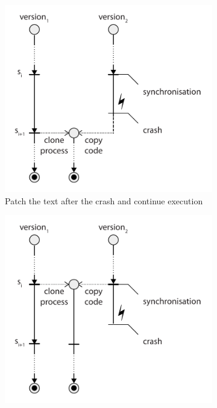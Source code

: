 \begin{figure}[!t]
  \begin{center}
    \begin{subfigure}[b]{0.45\textwidth}
      \includegraphics[width=\textwidth]{multi-version/figures/solution1}
      \caption{Patch the text after the crash and continue execution}
      \label{fig:recovery-solution1}
    \end{subfigure}
    \quad
    \begin{subfigure}[b]{0.45\textwidth}
      \includegraphics[width=\textwidth]{multi-version/figures/solution2}

\end{subfigure}
\end{center}
\end{figure}
